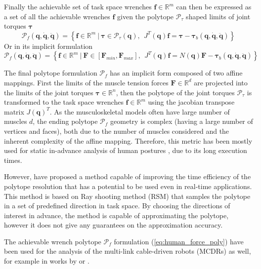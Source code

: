 Finally the achievable set of task space wrenches $\bm{f}\in\mathbb{R}^m$ can then be expressed as a set of all the achievable wrenches $\bm{f}$ given the polytope $\mathcal{P}_\tau$ shaped limits of joint torques $\bm{\tau}$
\begin{equation}
    \mathcal{P}_f(\bm{q},\dot{\bm{q}},\ddot{\bm{q}}) = \left\{ \bm{f} \in \mathbb{R}^m ~|~ \bm{\tau}\in \mathcal{P}_\tau(\bm{q}), ~~ J^T(\bm{q})\bm{f} = \bm{\tau} -\bm{\tau}_b(\bm{q},\dot{\bm{q}},\ddot{\bm{q}}) \right\}
    \label{eq:human_force_poly_ver_poly_lim}
\end{equation}
Or in its implicit formulation
\begin{equation}
    \mathcal{P}_f(\bm{q},\dot{\bm{q}},\ddot{\bm{q}}) = \left\{ \bm{f} \in \mathbb{R}^m ~|~ \bm{F}\in\left[\bm{F}_{min}, \bm{F}_{max} \right], ~~ \!J^T(\bm{q})\bm{f} =\! N(\bm{q})\bm{F} -\bm{\tau}_b(\bm{q},\dot{\bm{q}},\ddot{\bm{q}}) \right\}
    \label{eq:human_force_poly}
\end{equation}

The final polytope formulation $\mathcal{P}_f$ has an implicit form composed of two affine mappings. First the limits of the muscle tension forces $\bm{F}\in \mathbb{R}^d$ are projected into the limits of the joint torques $\bm{\tau}\in \mathbb{R}^n$, then the polytope of the joint torques $\mathcal{P}_\tau$ is transformed to the task space wrenches $\bm{f}\in \mathbb{R}^m$ using the jacobian transpose matrix $J(\bm{q})^T$. As the musculoskeletal models often have large number of muscles $d$, the ending polytope $\mathcal{P}_f$ geometry is complex (having a large number of vertices and faces), both due to the number of muscles considered and the inherent complexity of the affine mapping. Therefore, this metric has been mostly used for static in-advance analysis of human postures \cite{hernandez_toward_2015}, due to its long execution times. 

However, \citet{carmichael_estimating_2013, carmichael2011Towards} have proposed a method capable of improving the time efficiency of the polytope resolution that has a potential to be used even in real-time applications. This method is based on Ray shooting method (RSM) that samples the polytope in a set of predefined direction in task space. By choosing the directions of interest in advance, the method is capable of approximating the polytope, however it does not give any guarantees on the approximation accuracy.

The achievable wrench polytope $\mathcal{P}_f$ formulation (\ref{eq:human_force_poly}) have been used for the analysis of the multi-link cable-driven robots (MCDRs) as well, for example in works by \citet{sheng2020operational} or \citet{Muralidharan2022}.

